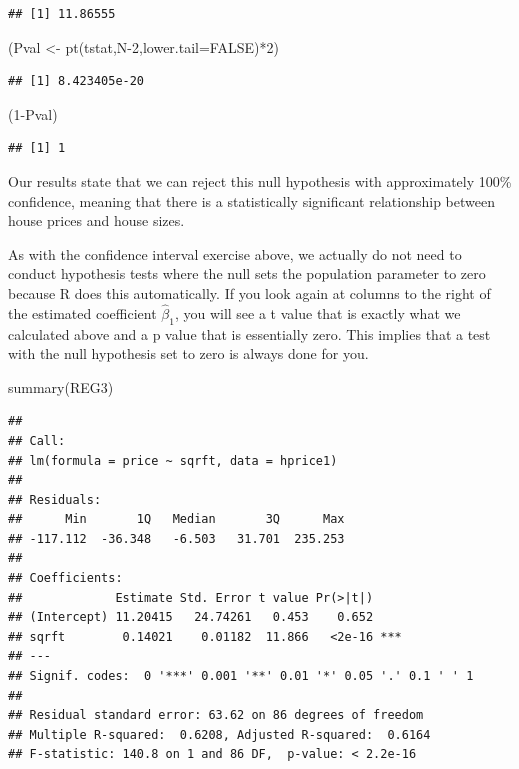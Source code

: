 \documentclass[
]{book}
\newenvironment{Shaded}{\begin{snugshade}}{\end{snugshade}}
\newcommand{\AttributeTok}[1]{\textcolor[rgb]{0.77,0.63,0.00}{#1}}
\newcommand{\ConstantTok}[1]{\textcolor[rgb]{0.00,0.00,0.00}{#1}}
\newcommand{\DecValTok}[1]{\textcolor[rgb]{0.00,0.00,0.81}{#1}}
\newcommand{\FunctionTok}[1]{\textcolor[rgb]{0.00,0.00,0.00}{#1}}
\newcommand{\NormalTok}[1]{#1}
\newcommand{\OtherTok}[1]{\textcolor[rgb]{0.56,0.35,0.01}{#1}}
\newcommand{\SpecialCharTok}[1]{\textcolor[rgb]{0.00,0.00,0.00}{#1}}
\begin{document}
\begin{verbatim}
## [1] 11.86555
\end{verbatim}

\begin{Shaded}
\begin{Highlighting}[]
\NormalTok{(Pval }\OtherTok{\textless{}{-}} \FunctionTok{pt}\NormalTok{(tstat,N}\DecValTok{{-}2}\NormalTok{,}\AttributeTok{lower.tail=}\ConstantTok{FALSE}\NormalTok{)}\SpecialCharTok{*}\DecValTok{2}\NormalTok{)}
\end{Highlighting}
\end{Shaded}

\begin{verbatim}
## [1] 8.423405e-20
\end{verbatim}

\begin{Shaded}
\begin{Highlighting}[]
\NormalTok{(}\DecValTok{1}\SpecialCharTok{{-}}\NormalTok{Pval)}
\end{Highlighting}
\end{Shaded}

\begin{verbatim}
## [1] 1
\end{verbatim}

Our results state that we can reject this null hypothesis with approximately 100\% confidence, meaning that there is a statistically significant relationship between house prices and house sizes.

As with the confidence interval exercise above, we actually do not need to conduct hypothesis tests where the null sets the population parameter to zero because R does this automatically. If you look again at columns to the right of the estimated coefficient \(\hat{\beta}_1\), you will see a t value that is exactly what we calculated above and a p value that is essentially zero. This implies that a test with the null hypothesis set to zero is always done for you.

\begin{Shaded}
\begin{Highlighting}[]
\FunctionTok{summary}\NormalTok{(REG3)}
\end{Highlighting}
\end{Shaded}

\begin{verbatim}
## 
## Call:
## lm(formula = price ~ sqrft, data = hprice1)
## 
## Residuals:
##      Min       1Q   Median       3Q      Max 
## -117.112  -36.348   -6.503   31.701  235.253 
## 
## Coefficients:
##             Estimate Std. Error t value Pr(>|t|)    
## (Intercept) 11.20415   24.74261   0.453    0.652    
## sqrft        0.14021    0.01182  11.866   <2e-16 ***
## ---
## Signif. codes:  0 '***' 0.001 '**' 0.01 '*' 0.05 '.' 0.1 ' ' 1
## 
## Residual standard error: 63.62 on 86 degrees of freedom
## Multiple R-squared:  0.6208, Adjusted R-squared:  0.6164 
## F-statistic: 140.8 on 1 and 86 DF,  p-value: < 2.2e-16
\end{verbatim}
\end{document}

